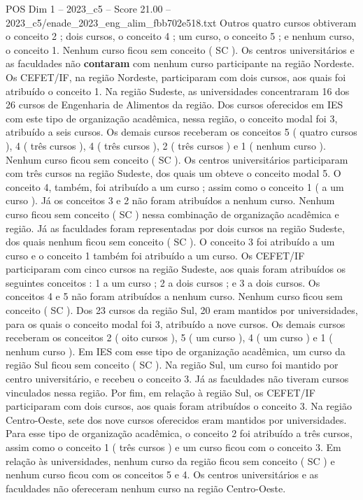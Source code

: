 \begin{textsample}{POS Dim 1 – 2023\_c5 – Score 21.00 – 2023\_c5/enade\_2023\_eng\_alim\_fbb702e518.txt}
Outros quatro cursos obtiveram o conceito 2 ; dois cursos, o conceito 4 ; um curso, o conceito 5 ; e nenhum curso, o conceito 1.
Nenhum curso ficou sem conceito ( SC ).
Os centros universitários e as faculdades não \textbf{contaram} com nenhum curso participante na região Nordeste.
Os CEFET/IF, na região Nordeste, participaram com dois cursos, aos quais foi atribuído o conceito 1.
Na região Sudeste, as universidades concentraram 16 dos 26 cursos de Engenharia de Alimentos da região.
Dos cursos oferecidos em IES com este tipo de organização acadêmica, nessa região, o conceito modal foi 3, atribuído a seis cursos.
Os demais cursos receberam os conceitos 5 ( quatro cursos ), 4 ( três cursos ), 4 ( três cursos ), 2 ( três cursos ) e 1 ( nenhum curso ).
Nenhum curso ficou sem conceito ( SC ).
Os centros universitários participaram com três cursos na região Sudeste, dos quais um obteve o conceito modal 5.
O conceito 4, também, foi atribuído a um curso ; assim como o conceito 1 ( a um curso ).
Já os conceitos 3 e 2 não foram atribuídos a nenhum curso.
Nenhum curso ficou sem conceito ( SC ) nessa combinação de organização acadêmica e região.
Já as faculdades foram representadas por dois cursos na região Sudeste, dos quais nenhum ficou sem conceito ( SC ).
O conceito 3 foi atribuído a um curso e o conceito 1 também foi atribuído a um curso.
Os CEFET/IF participaram com cinco cursos na região Sudeste, aos quais foram atribuídos os seguintes conceitos : 1 a um curso ; 2 a dois cursos ; e 3 a dois cursos.
Os conceitos 4 e 5 não foram atribuídos a nenhum curso.
Nenhum curso ficou sem conceito ( SC ).
Dos 23 cursos da região Sul, 20 eram mantidos por universidades, para os quais o conceito modal foi 3, atribuído a nove cursos.
Os demais cursos receberam os conceitos 2 ( oito cursos ), 5 ( um curso ), 4 ( um curso ) e 1 ( nenhum curso ).
Em IES com esse tipo de organização acadêmica, um curso da região Sul ficou sem conceito ( SC ).
Na região Sul, um curso foi mantido por centro universitário, e recebeu o conceito 3.
Já as faculdades não tiveram cursos vinculados nessa região.
Por fim, em relação à região Sul, os CEFET/IF participaram com dois cursos, aos quais foram atribuídos o conceito 3.
Na região Centro-Oeste, sete dos nove cursos oferecidos eram mantidos por universidades.
Para esse tipo de organização acadêmica, o conceito 2 foi atribuído a três cursos, assim como o conceito 1 ( três cursos ) e um curso ficou com o conceito 3.
Em relação às universidades, nenhum curso da região ficou sem conceito ( SC ) e nenhum curso ficou com os conceitos 5 e 4.
Os centros universitários e as faculdades não ofereceram nenhum curso na região Centro-Oeste.

\end{textsample}
